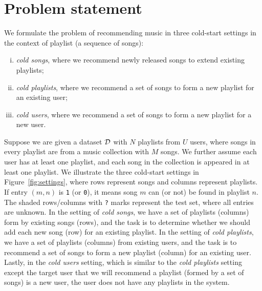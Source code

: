 \section{Problem statement}
\label{sec:problem}

We formulate the problem of recommending music in three cold-start settings in the context of 
playlist (\ie a sequence of songs):
\begin{enumerate}[(i)]
\item \emph{cold songs}, where we recommend newly released songs to extend existing playlists;
\item \emph{cold playlists}, where we recommend a set of songs to form a new playlist for an existing user;
\item \emph{cold users}, where we recommend a set of songs to form a new playlist for a new user.
\end{enumerate}


Suppose we are given a dataset $\mathcal{D}$ with $N$ playlists from $U$ users, 
where songs in every playlist are from a music collection with $M$ songs.
We further assume each user has at least one playlist, and each song in the collection 
is appeared in at least one playlist.
We illustrate the three cold-start settings in Figure~\ref{fig:settings},
where rows represent songs and columns represent playlists.
If entry $(m, n)$ is \texttt{1} (or \texttt{0}), it means song $m$ can (or not) be found in playlist $n$.
The shaded rows/columns with \texttt{?} marks represent the test set, where all entries are unknown.
In the setting of \emph{cold songs}, we have a set of playlists (columns) form by existing songs (rows),
and the task is to determine whether we should add each new song (row) for an existing playlist.
In the setting of \emph{cold playlists}, we have a set of playlists (columns) from existing users,
and the task is to recommend a set of songs to form a new playlist (column) for an existing user.
Lastly, in the \emph{cold users} setting, which is similar to the {\it cold playlists} setting except
the target user that we will recommend a playlist (formed by a set of songs) is a new user, \ie the user
does not have any playlists in the system.

